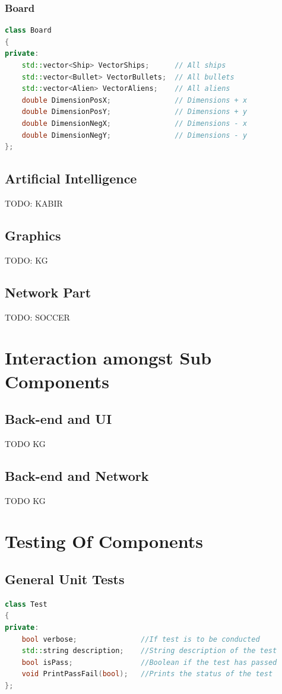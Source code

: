 \documentclass{article}
\begin{document}
				\subsubsection{Board}
					\begin{lstlisting}[language=C++, caption={Class Parameters for Board}]
class Board
{
private:
	std::vector<Ship> VectorShips;		// All ships
	std::vector<Bullet> VectorBullets;	// All bullets
	std::vector<Alien> VectorAliens;	// All aliens
	double DimensionPosX;				// Dimensions + x	
	double DimensionPosY;				// Dimensions + y	
	double DimensionNegX;				// Dimensions - x	
	double DimensionNegY;				// Dimensions - y		
};
					\end{lstlisting}
			\subsection{Artificial Intelligence}
				TODO: KABIR
			\subsection{Graphics}
				TODO: KG
			\subsection{Network Part}
				TODO: SOCCER
	\section{Interaction amongst Sub Components}
			\subsection{Back-end and UI}
				TODO KG
			\subsection{Back-end and Network}
				TODO KG
	\section{Testing Of Components}
			\subsection{General Unit Tests}
				\begin{lstlisting}[language=C++, caption={Class Parameters for Test}]
class Test
{
private:
	bool verbose;               //If test is to be conducted
	std::string description;    //String description of the test
	bool isPass;                //Boolean if the test has passed 
	void PrintPassFail(bool);   //Prints the status of the test
};
				\end{lstlisting}
\end{document}
